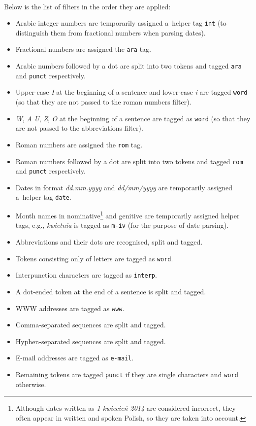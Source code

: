 \documentclass[oneside,12pt]{article}
\begin{document}
\paragraph{}
Below is the list of filters in the order they are applied:
    \begin{itemize}
        \item Arabic integer numbers are temporarily assigned a~helper tag \texttt{int} (to distinguish them from fractional numbers when parsing dates).
        \item Fractional numbers are assigned the \texttt{ara} tag.
        \item Arabic numbers followed by a dot are split into two tokens and tagged \texttt{ara} and \texttt{punct} respectively.
        \item Upper-case \textit{I} at the beginning of a sentence and lower-case \textit{i} are tagged \texttt{word} (so that they are not passed to the roman numbers filter).
        \item \textit{W}, \textit{A} \textit{U}, \textit{Z}, \textit{O} at the beginning of a sentence are tagged as \texttt{word} (so that they are not passed to the abbreviations filter).
        \item Roman numbers are assigned the \texttt{rom} tag.
        \item Roman numbers followed by a dot are split into two tokens and tagged \texttt{rom} and \texttt{punct} respectively.
        \item Dates in format \textit{dd.mm.yyyy} and \textit{dd/mm/yyyy} are temporarily assigned a~helper tag \texttt{date}.
        \item Month names in nominative\footnote{Although dates written as \textit{1 kwiecień 2014} are considered incorrect, they often appear in written and spoken Polish, so they are taken into account.} and genitive are temporarily assigned helper tags, e.g., \textit{kwietnia} is tagged as \texttt{m-iv} (for the purpose of date parsing).
        \item Abbreviations and their dots are recognised, split and tagged.
        \item Tokens consisting only of letters are tagged as \texttt{word}.
        \item Interpunction characters are tagged as \texttt{interp}.
        \item A dot-ended token at the end of a sentence is split and tagged.
        \item WWW addresses are tagged as \texttt{www}.
        \item Comma-separated sequences are split and tagged.
        \item Hyphen-separated sequences are split and tagged.
        \item E-mail addresses are tagged as \texttt{e-mail}.
        \item Remaining tokens are tagged \texttt{punct} if they are single characters and \texttt{word} otherwise.
    \end{itemize}
\end{document}
